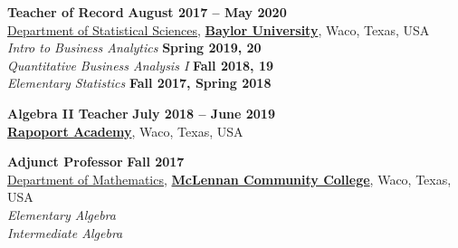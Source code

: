 \documentclass[10pt]{article}
\newcommand{\blankline}{\quad\pagebreak[2]}
\begin{document}
\blankline

\textbf{Teacher of Record} \hfill \textbf{August 2017 -- May 2020} \\
\href{https://www.baylor.edu/statistics/}{Department of Statistical Sciences}, \href{http://www.baylor.edu}{\textbf{Baylor University}}, Waco, Texas, USA \\
    \phantom{\hspace{0.25in}} \emph{Intro to Business Analytics} \hfill \textbf{Spring 2019, 20} \\
    \phantom{\hspace{0.25in}} \emph{Quantitative Business Analysis I} \hfill \textbf{Fall 2018, 19} \\
    \phantom{\hspace{0.25in}} \emph{Elementary Statistics} \hfill \textbf{Fall 2017, Spring 2018}

\blankline

\textbf{Algebra II Teacher} \hfill \textbf{July 2018 -- June 2019} \\
\href{https://www.rapoportacademy.org}{\textbf{Rapoport Academy}}, Waco, Texas, USA

\blankline

\textbf{Adjunct Professor} \hfill \textbf{Fall 2017} \\
\href{http://www.mclennan.edu/mathematics-department/}{Department of Mathematics}, \href{http://www.mclennan.edu}{\textbf{McLennan Community College}}, Waco, Texas, USA \\
    \phantom{\hspace{0.25in}} \emph{Elementary Algebra} \\
    \phantom{\hspace{0.25in}} \emph{Intermediate Algebra}

\blankline

%
%
%
%
\end{document}
